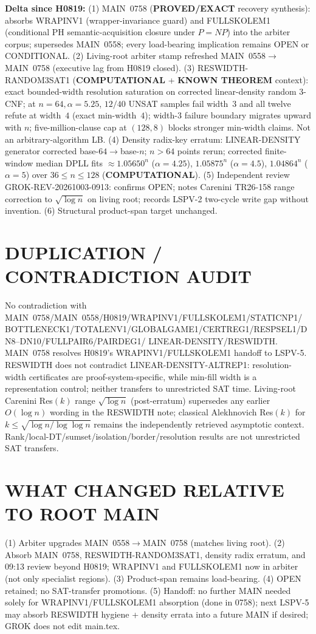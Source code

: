 \documentclass[11pt]{article}
\begin{document}
\textbf{Delta since H0819:}
(1) MAIN~0758 (\textbf{PROVED/EXACT} recovery synthesis): absorbs WRAPINV1 (wrapper-invariance guard)
and FULLSKOLEM1 (conditional PH semantic-acquisition closure under $P=NP$) into the arbiter corpus;
supersedes MAIN~0558; every load-bearing implication remains OPEN or CONDITIONAL.
(2) Living-root arbiter stamp refreshed MAIN~0558$\to$MAIN~0758 (executive lag from H0819 closed).
(3) RESWIDTH-RANDOM3SAT1 (\textbf{COMPUTATIONAL} + \textbf{KNOWN THEOREM} context): exact
bounded-width resolution saturation on corrected linear-density random 3-CNF; at
$n=64,\alpha=5.25$, $12/40$ UNSAT samples fail width~$3$ and all twelve refute at width~$4$
(exact min-width~$4$); width-$3$ failure boundary migrates upward with $n$; five-million-clause
cap at $(128,8)$ blocks stronger min-width claims. Not an arbitrary-algorithm LB.
(4) Density radix-key erratum: LINEAR-DENSITY generator corrected base-$64\to$base-$n$;
$n>64$ points rerun; corrected finite-window median DPLL fits
$\approx 1.05650^n$ ($\alpha=4.25$), $1.05875^n$ ($\alpha=4.5$), $1.04864^n$ ($\alpha=5$)
over $36\le n\le128$ (\textbf{COMPUTATIONAL}).
(5) Independent review GROK-REV-20261003-0913: confirms OPEN; notes Carenini TR26-158
range correction to $\sqrt{\log n}$ on living root; records LSPV-2 two-cycle write gap without
invention.
(6) Structural product-span target unchanged.

\section*{DUPLICATION / CONTRADICTION AUDIT}
No contradiction with MAIN~0758/MAIN~0558/H0819/WRAPINV1/FULLSKOLEM1/STATICNP1/
BOTTLENECK1/TOTALENV1/GLOBALGAME1/CERTREG1/RESPSEL1/DN8--DN10/FULLPAIR6/PAIRDEG1/
LINEAR-DENSITY/RESWIDTH.
MAIN~0758 resolves H0819's WRAPINV1/FULLSKOLEM1 handoff to LSPV-5.
RESWIDTH does not contradict LINEAR-DENSITY-ALTREP1: resolution-width certificates are
proof-system-specific, while min-fill width is a representation control; neither transfers to
unrestricted SAT time.
Living-root Carenini Res$(k)$ range $\sqrt{\log n}$ (post-erratum) supersedes any earlier
$O(\log n)$ wording in the RESWIDTH note; classical Alekhnovich Res$(k)$ for
$k\le\sqrt{\log n/\log\log n}$ remains the independently retrieved asymptotic context.
Rank/local-DT/sumset/isolation/border/resolution results are not unrestricted SAT transfers.

\section*{WHAT CHANGED RELATIVE TO ROOT MAIN}
(1) Arbiter upgrades MAIN~0558$\to$MAIN~0758 (matches living root). (2) Absorb MAIN~0758,
RESWIDTH-RANDOM3SAT1, density radix erratum, and 09:13 review beyond H0819; WRAPINV1 and
FULLSKOLEM1 now in arbiter (not only specialist regions). (3) Product-span remains
load-bearing. (4) OPEN retained; no SAT-transfer promotions. (5) Handoff: no further MAIN
needed solely for WRAPINV1/FULLSKOLEM1 absorption (done in 0758); next LSPV-5 may absorb
RESWIDTH hygiene + density errata into a future MAIN if desired; GROK does not edit main.tex.
\end{document}
